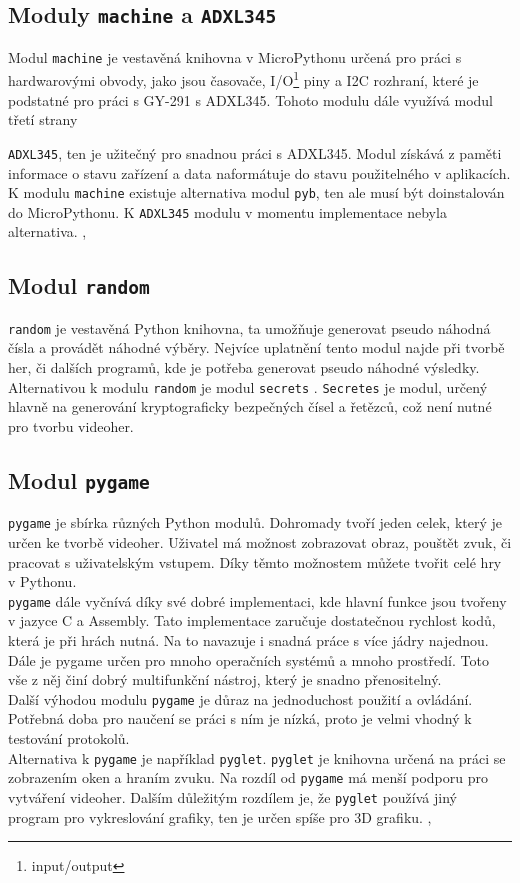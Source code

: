 \documentclass[12pt]{report}			%
\begin{document}
\subsection{Moduly \texttt{machine} a \texttt{ADXL345}}
Modul \texttt{machine} je vestavěná knihovna v MicroPythonu určená pro práci s hardwarovými obvody, jako jsou časovače, I/O\footnote{input/output} piny a I2C rozhraní, které je podstatné pro práci s GY-291 s ADXL345. Tohoto modulu dále využívá modul třetí strany \cite{machine}

\texttt{ADXL345}, ten je užitečný pro snadnou práci s ADXL345. Modul získává z paměti informace o stavu zařízení a data naformátuje do stavu použitelného v aplikacích. K modulu \texttt{machine} existuje alternativa modul \texttt{pyb}, ten ale musí být doinstalován do MicroPythonu. K \texttt{ADXL345} modulu v momentu implementace nebyla alternativa. \cite{pyb}, \cite{adxl}


\subsection{Modul \texttt{random}}
\texttt{random} je vestavěná Python knihovna, ta umožňuje generovat pseudo náhodná čísla a provádět náhodné výběry. Nejvíce uplatnění tento modul najde při tvorbě her, či dalších programů, kde je potřeba generovat pseudo náhodné výsledky. \cite{random}
\\
Alternativou k modulu \texttt{random} je modul
 \texttt{secrets}
 . \texttt{Secretes} je modul, určený hlavně na generování kryptograficky bezpečných čísel a řetězců, což není nutné pro tvorbu videoher. \cite{secretes}
 
 
\subsection{Modul \texttt{pygame}}
\texttt{pygame} je sbírka různých Python modulů. Dohromady tvoří jeden celek, který je určen ke tvorbě videoher. Uživatel má možnost zobrazovat obraz, pouštět zvuk, či pracovat s uživatelským vstupem. Díky těmto možnostem můžete tvořit celé hry v Pythonu. \cite{pygame}
\\
\texttt{pygame} dále vyčnívá díky své dobré implementaci, kde hlavní funkce jsou tvořeny v jazyce C a Assembly. Tato implementace zaručuje dostatečnou rychlost kodů, která je při hrách nutná. Na to navazuje i snadná práce s více jádry najednou. Dále je pygame určen pro mnoho operačních systémů a mnoho prostředí. Toto vše z něj činí dobrý multifunkční nástroj, který je snadno přenositelný. 
\\
Další výhodou modulu \texttt{pygame} je důraz na jednoduchost použití a ovládání. Potřebná doba pro naučení se práci s ním je nízká, proto je velmi vhodný k testování protokolů.  
\\
Alternativa k \texttt{pygame} je například \texttt{pyglet}. \texttt{pyglet} je knihovna určená na práci se zobrazením oken a hraním zvuku. Na rozdíl od \texttt{pygame} má menší podporu pro vytváření videoher. Dalším důležitým rozdílem je, že \texttt{pyglet} používá jiný program pro vykreslování grafiky, ten je určen spíše pro 3D grafiku. \cite{pygame}, \cite{pyglet}
\end{document}
